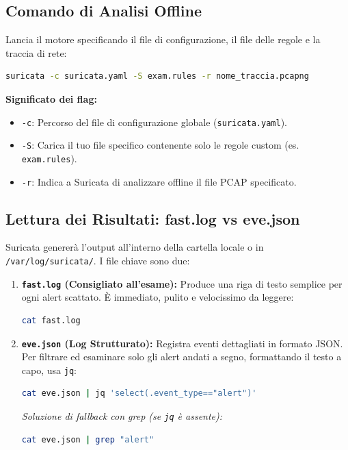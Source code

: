 \documentclass[12pt,a4paper]{report}
\begin{document}
	\subsection{Comando di Analisi Offline}
	Lancia il motore specificando il file di configurazione, il file delle regole e la traccia di rete:
	\begin{lstlisting}[language=bash]
		suricata -c suricata.yaml -S exam.rules -r nome_traccia.pcapng
	\end{lstlisting}
	\textbf{Significato dei flag:}
	\begin{itemize}
		\item \texttt{-c}: Percorso del file di configurazione globale (\texttt{suricata.yaml}).
		\item \texttt{-S}: Carica il tuo file specifico contenente solo le regole custom (es. \texttt{exam.rules}).
		\item \texttt{-r}: Indica a Suricata di analizzare offline il file PCAP specificato.
	\end{itemize}
	
	\subsection{Lettura dei Risultati: fast.log vs eve.json}
	Suricata genererà l'output all'interno della cartella locale o in \texttt{/var/log/suricata/}. I file chiave sono due:
	\begin{enumerate}
	\item \textbf{\texttt{fast.log} (Consigliato all'esame):} Produce una riga di testo semplice per ogni alert scattato. È immediato, pulito e velocissimo da leggere:
	\begin{lstlisting}[language=bash]
		cat fast.log
	\end{lstlisting}
	\item \textbf{\texttt{eve.json} (Log Strutturato):} Registra eventi dettagliati in formato JSON. Per filtrare ed esaminare solo gli alert andati a segno, formattando il testo a capo, usa \texttt{jq}:
	\begin{lstlisting}[language=bash]
		cat eve.json | jq 'select(.event_type=="alert")'
	\end{lstlisting}
	\textit{Soluzione di fallback con grep (se \texttt{jq} è assente):}
	\begin{lstlisting}[language=bash]
		cat eve.json | grep "alert"
	\end{lstlisting}
	\end{enumerate}
	
\end{document}
